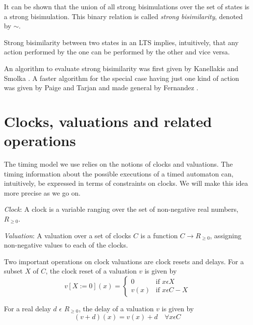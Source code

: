 \documentclass[a4paper]{llncs}
\begin{document}
It can be shown that the union of
all strong bisimulations over the set of states is a strong
bisimulation. This binary relation is called \textit{strong
  bisimilarity}, denoted by $\sim$.

Strong bisimilarity between two states in an LTS implies,
intuitively, that any action performed by the one can be performed by
the other and vice versa.

An algorithm to evaluate strong bisimilarity was first given by
Kanellakis and Smolka \cite{kanellakis1990ccs}. A faster algorithm for
the special case having just one kind of action was given by Paige and
Tarjan \cite{paige1987three} and made general by Fernandez
\cite{fernandez1990implementation}.

\section{Clocks, valuations and related operations}

The timing model we use relies on the notions of clocks and
valuations. The timing information about the possible executions of a
timed automaton can, intuitively, be expressed in terms of constraints
on clocks. We will make this idea more precise as we go on.

\begin{definition}
\emph{Clock}: A clock is a variable ranging over the set of
non-negative real numbers, $R_{\geq 0}$.
\end{definition}

\begin{definition}
\emph{Valuation}: A valuation over a set of clocks $C$ is a
function $C \rightarrow R_{\geq 0}$, assigning non-negative values
to each of the clocks.
\end{definition}

Two important operations on clock valuations are clock resets and
delays. For a subset $X$ of $C$, the clock reset of a valuation $v$
is given by
\begin{displaymath}
  v[X:=0](x) = 
  \begin{cases}
    0    & \text{if } x \epsilon X \\
    v(x) & \text{if } x \epsilon C - X
  \end{cases}
\end{displaymath}

For a real delay $d$ $\epsilon$ $R_{\geq 0}$, the delay of a valuation
$v$ is given by
\begin{displaymath}
  (v + d)(x) = v(x) + d \quad \forall x \epsilon C
\end{displaymath}
\end{document}
